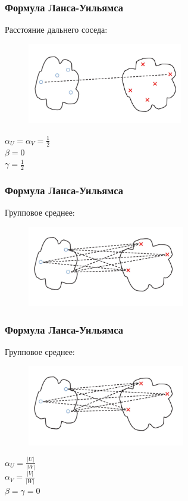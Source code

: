 \documentclass[12pt]{beamer}
\begin{document}
\begin{frame}\frametitle{Формула Ланса-Уильямса}
Расстояние дальнего соседа:\\
\begin{figure}[htbp]
  \includegraphics[height=100pt, keepaspectratio = true]{images/lans2}  
\end{figure}
${\alpha_U = \alpha_V = \frac{1}{2}}$ \\${\beta = 0}$ \\${\gamma = \frac{1}{2}}$
\end{frame}

\begin{frame}\frametitle{Формула Ланса-Уильямса}
Групповое среднее:\\
\begin{figure}[htbp]
  \includegraphics[height=100pt, keepaspectratio = true]{images/lans3}  
\end{figure}
\end{frame}

\begin{frame}\frametitle{Формула Ланса-Уильямса}
Групповое среднее:\\
\begin{figure}[htbp]
  \includegraphics[height=100pt, keepaspectratio = true]{images/lans3}  
\end{figure}
${\alpha_U = \frac{\vert U \vert}{\vert W \vert}}$\\${\alpha_V = \frac{\vert V \vert}{\vert W \vert}}$ \\${\beta = \gamma = 0}$
\end{frame}
\end{document}
